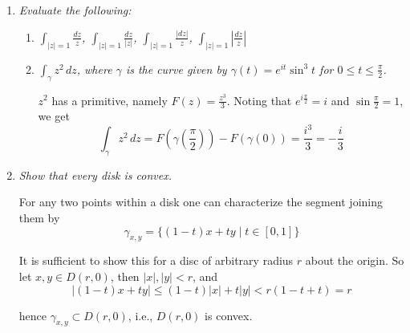 \documentclass[letterpaper, 11pt]{article}
\begin{document}
\begin{enumerate}
\item \emph{Evaluate the following:}
\begin{enumerate}
\item \emph{$\int_{|z| = 1} \frac{dz}{z}$, $\int_{|z| = 1} \frac{dz}{|z|}$, $\int_{|z| = 1} \frac{|dz|}{z}$, $\int_{|z| = 1} \left|\frac{dz}{z}\right|$}
\item \emph{$\int_{\gamma} z^2\,dz$, where $\gamma$ is the curve given by $\gamma(t) = e^{it}\sin^3t$ for $0 \leq t \leq \frac{\pi}{2}$.}

$z^2$ has a primitive, namely $F(z) = \frac{z^3}{3}$.  Noting that $e^{i\frac{\pi}{2}} = i$ and $\sin\frac{\pi}{2} = 1$, we get
\[
\int_{\gamma} z^2\,dz = F\left(\gamma\left(\frac{\pi}{2}\right)\right) - F(\gamma(0)) = \frac{i^3}{3} = -\frac{i}{3}
\]
\end{enumerate}

\item \emph{Show that every disk is convex.}

For any two points within a disk one can characterize the segment joining them by
\[
\gamma_{x,y} = \{(1-t)x + ty \mid t \in [0,1] \}
\]

It is sufficient to show this for a disc of arbitrary radius $r$ about the origin.  So let $x,y \in D(r,0)$, then $|x|, |y| < r$, and
\[
|(1-t)x + ty| \leq (1-t)|x| + t|y| < r(1-t+t) = r
\]

hence $\gamma_{x,y} \subset D(r,0)$, i.e., $D(r,0)$ is convex.
\end{enumerate}
\end{document}
